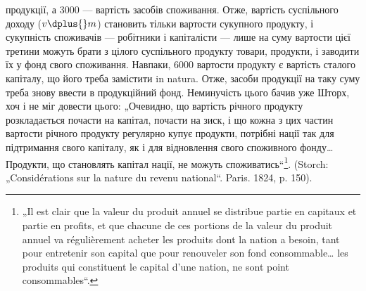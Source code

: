 \parcont{}  %
продукції, а 3000 — вартість засобів споживання. Отже, вартість суспільного
доходу ($v \dplus{} m$) становить тільки  вартости сукупного продукту,
і сукупність споживачів — робітники і капіталісти — лише на суму вартости
цієї третини можуть брати з цілого суспільного продукту товари,
продукти, і заводити їх у фонд свого споживання. Навпаки, 6000 \deq{} 
вартости продукту є вартість сталого капіталу, що його треба замістити
in natura. Отже, засоби продукції на таку суму треба знову ввести в
продукційний фонд. Неминучість цього бачив уже Шторх, хоч і не міг
довести цього: „Очевидно, що вартість річного продукту розкладається
почасти на капітал, почасти на зиск, і що кожна з цих частин вартости річного
продукту регулярно купує продукти, потрібні нації так для підтримання
свого капіталу, як і для відновлення свого споживного фонду\dots{} Продукти,
що становлять капітал нації, не можуть споживатись“\footnote*{
„Il est clair que la valeur du produit annuel se distribue partie en capitaux
et partie en profits, et que chacune de ces portions de la valeur du produit annuel
va régulièrement acheter les produits dont la nation a besoin, tant pour entretenir
son capital que pour renouveler son fond consommable\dots{} les produits qui constituent
le capital d’une nation, ne sont point consommables“.
}. (Storch:
„Considérations sur la nature du revenu national“. Paris. 1824, p. 150).

